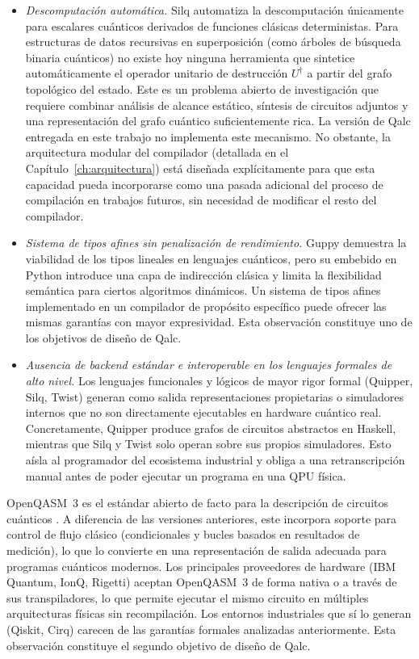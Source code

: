 \begin{itemize}
  \item \textit{Descomputación automática.} Silq automatiza la descomputación únicamente para escalares cuánticos derivados de funciones clásicas deterministas. Para estructuras de datos recursivas en superposición (como árboles de búsqueda binaria cuánticos) no existe hoy ninguna herramienta que sintetice automáticamente el operador unitario de destrucción $U^\dagger$ a partir del grafo topológico del estado. Este es un problema abierto de investigación que requiere combinar análisis de alcance estático, síntesis de circuitos adjuntos y una representación del grafo cuántico suficientemente rica. La versión de Qalc entregada en este trabajo no implementa este mecanismo. No obstante, la arquitectura modular del compilador (detallada en el Capítulo~\ref{ch:arquitectura}) está diseñada explícitamente para que esta capacidad pueda incorporarse como una pasada adicional del proceso de compilación en trabajos futuros, sin necesidad de modificar el resto del compilador.

  \item \textit{Sistema de tipos afines sin penalización de rendimiento.} Guppy demuestra la viabilidad de los tipos lineales en lenguajes cuánticos, pero su embebido en Python introduce una capa de indirección clásica y limita la flexibilidad semántica para ciertos algoritmos dinámicos. Un sistema de tipos afines implementado en un compilador de propósito específico puede ofrecer las mismas garantías con mayor expresividad. Esta observación constituye uno de los objetivos de diseño de Qalc.

  \item \textit{Ausencia de backend estándar e interoperable en los lenguajes formales de alto nivel.} Los lenguajes funcionales y lógicos de mayor rigor formal (Quipper, Silq, Twist) generan como salida representaciones propietarias o simuladores internos que no son directamente ejecutables en hardware cuántico real. Concretamente, Quipper produce grafos de circuitos abstractos en Haskell, mientras que Silq y Twist solo operan sobre sus propios simuladores. Esto aísla al programador del ecosistema industrial y obliga a una retranscripción manual antes de poder ejecutar un programa en una QPU física.
\end{itemize}

OpenQASM~3 es el estándar abierto de facto para la descripción de circuitos cuánticos \cite{openqasm3_2022}. A diferencia de las versiones anteriores, este incorpora soporte para control de flujo clásico (condicionales y bucles basados en resultados de medición), lo que lo convierte en una representación de salida adecuada para programas cuánticos modernos. Los principales proveedores de hardware (IBM Quantum, IonQ, Rigetti) aceptan OpenQASM~3 de forma nativa o a través de sus transpiladores, lo que permite ejecutar el mismo circuito en múltiples arquitecturas físicas sin recompilación. Los entornos industriales que sí lo generan (Qiskit, Cirq) carecen de las garantías formales analizadas anteriormente. Esta observación constituye el segundo objetivo de diseño de Qalc.

